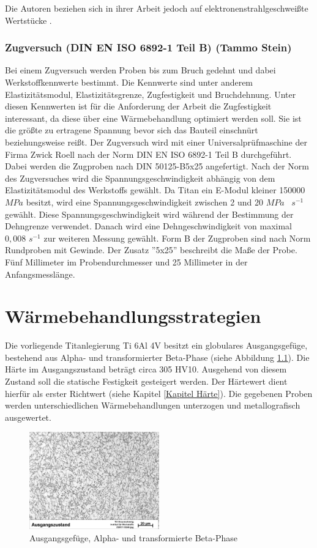 \documentclass[a4paper, 11pt]{tubsreprt}
\begin{document}
Die Autoren beziehen sich in ihrer Arbeit jedoch auf elektronenstrahlgeschweißte Wertstücke \cite{Shi2013}.
\subsection{Zugversuch (DIN EN ISO 6892-1 Teil B) (Tammo Stein)}
\label{Kapitel Zugversuch}
Bei einem Zugversuch werden Proben bis zum Bruch gedehnt und dabei Werkstoffkennwerte bestimmt. Die Kennwerte sind unter anderem  Elastizitätsmodul, Elastizitätsgrenze, Zugfestigkeit und Bruchdehnung. Unter diesen Kennwerten ist für die Anforderung der Arbeit die Zugfestigkeit interessant, da diese über eine Wärmebehandlung optimiert werden soll. Sie ist die größte zu ertragene Spannung bevor sich das Bauteil einschnürt beziehungsweise reißt. Der Zugversuch wird mit einer Universalprüfmaschine der Firma Zwick Roell nach der Norm DIN EN ISO 6892-1 Teil B durchgeführt. Dabei werden die Zugproben nach DIN 50125-B5x25 angefertigt. Nach der Norm des Zugversuches wird die Spannungsgeschwindigkeit abhängig von dem Elastizitätsmodul des Werkstoffs gewählt. Da Titan ein E-Modul kleiner 150000 $MPa$ besitzt, wird eine Spannungsgeschwindigkeit zwischen 2 und 20 $MPa$~ $s^{-1}$ gewählt. Diese Spannungsgeschwindigkeit wird während der Bestimmung der Dehngrenze verwendet. Danach wird eine Dehngeschwindigkeit von maximal $0,008$ $s^{-1}$ zur weiteren Messung gewählt. Form B der Zugproben sind nach Norm Rundproben mit Gewinde. Der Zusatz ''5x25'' beschreibt die Maße der Probe. Fünf Millimeter im Probendurchmesser und 25 Millimeter in der Anfangsmesslänge.



\chapter{Wärmebehandlungsstrategien}
Die vorliegende Titanlegierung Ti 6Al 4V besitzt ein globulares Ausgangsgefüge, bestehend aus Alpha- und transformierter Beta-Phase (siehe Abbildung \ref{ausgangsgefüge Kapitel3}). Die Härte im Ausgangszustand beträgt circa 305 HV10. Ausgehend von diesem Zustand soll die statische Festigkeit gesteigert werden. Der Härtewert dient hierfür als erster Richtwert (siehe Kapitel \ref{Kapitel Härte}). Die gegebenen Proben werden unterschiedlichen Wärmebehandlungen unterzogen und metallografisch ausgewertet. 

\begin{figure}
\centering
\includegraphics[width=0.5\textwidth]{Bilder/Ausgangsgefuege.jpg}
\caption{Ausgangsgefüge, Alpha- und transformierte Beta-Phase}
\label{ausgangsgefüge Kapitel3}
\end{figure}
\end{document}
